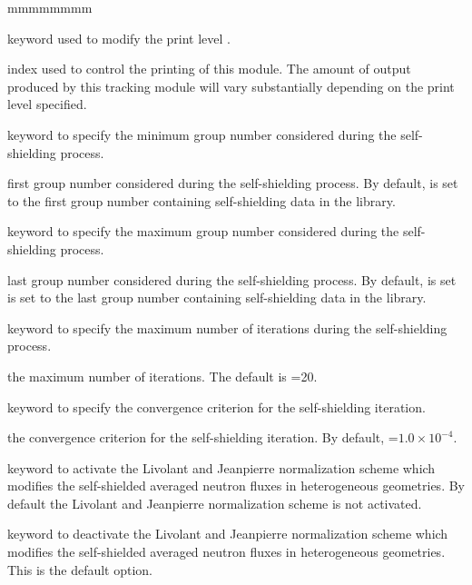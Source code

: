 \begin{ListeDeDescription}{mmmmmmmm}

\item[\moc{EDIT}] keyword used to modify the print level .

\item[\dusa{iprint}] index used to control the printing of this module. The
amount of output produced by this tracking module will vary substantially
depending on the print level specified. 

\item[\moc{GRMIN}] keyword to specify the minimum group number considered
during the self-shielding process.

\item[\dusa{lgrmin}] first group number considered during the
self-shielding process. By default,  is set to the first group
number containing self-shielding data in the library.

\item[\moc{GRMAX}]  keyword to specify the maximum group number considered
during the self-shielding process.

\item[\dusa{lgrmax}] last group number considered during the self-shielding
process. By default,  is set is set to the last group
number containing self-shielding data in the library.

\item[\moc{MXIT}]  keyword to specify the maximum number of iterations during
the self-shielding process.

\item[\dusa{imxit}] the maximum number of iterations. The default is
=20.

\item[\moc{EPS}] keyword to specify the convergence criterion for the
self-shielding iteration.

\item[\dusa{valeps}] the convergence criterion for the self-shielding iteration.
By default, =$1.0\times 10^{-4}$.

\item[\moc{LJ}] keyword to activate the Livolant and Jeanpierre
normalization scheme which modifies the self-shielded averaged neutron fluxes in
heterogeneous geometries. By default the Livolant and Jeanpierre
normalization scheme is not activated.

\item[\moc{NOLJ}] keyword to deactivate the Livolant and Jeanpierre
normalization scheme which modifies the self-shielded averaged neutron fluxes in
heterogeneous geometries. This is the default option.


\end{ListeDeDescription}

